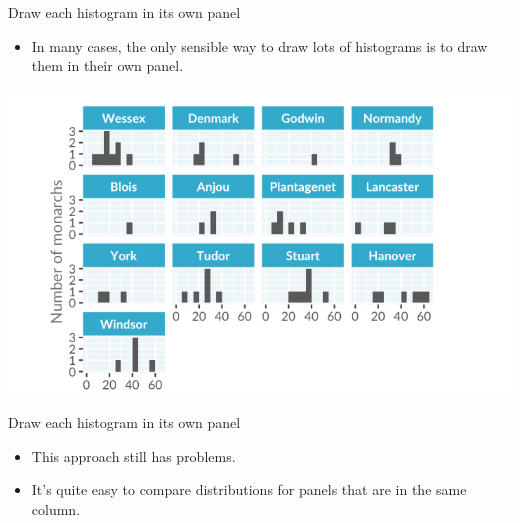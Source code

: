 \documentclass[
  ignorenonframetext,
]{beamer}
\providecommand{\tightlist}{%
  \setlength{\itemsep}{0pt}\setlength{\parskip}{0pt}}
\begin{document}
\begin{frame}{Draw each histogram in its own panel}
\label{draw-each-histogram-in-its-own-panel}
\begin{itemize}
\tightlist
\item
  In many cases, the only sensible way to draw lots of histograms is to
  draw them in their own panel.
\end{itemize}

\includegraphics{../images/im18.png}
\end{frame}

\begin{frame}{Draw each histogram in its own panel}
\label{draw-each-histogram-in-its-own-panel-1}
\begin{itemize}
\item
  This approach still has problems.
\item
  It's quite easy to compare distributions for panels that are in the
  same column.
\end{itemize}
\end{frame}
\end{document}
